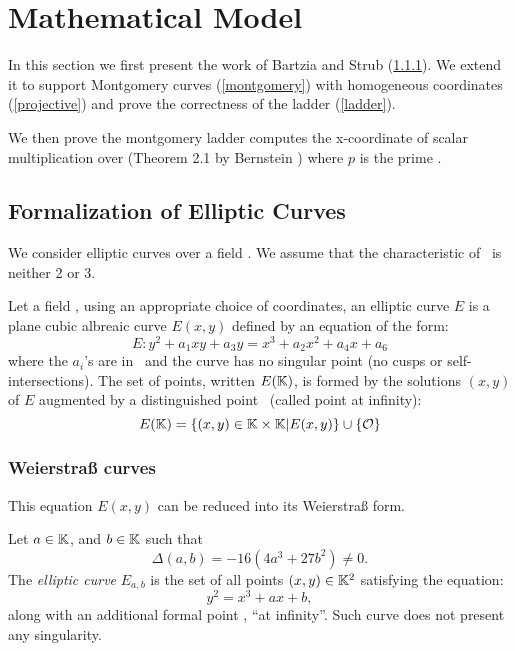 \section{Mathematical Model}

In this section we first present the work of Bartzia and Strub \cite{DBLP:conf/itp/BartziaS14} (\ref{Weierstrass}).
We extend it to support Montgomery curves (\ref{montgomery}) with homogeneous coordinates (\ref{projective}) and prove the correctness of the ladder (\ref{ladder}).

We then prove the montgomery ladder computes
the x-coordinate of scalar multiplication over 
(Theorem 2.1 by Bernstein \cite{Ber06}) where $p$ is the prime \p.

\subsection{Formalization of Elliptic Curves}

We consider elliptic curves over a field \K. We assume that the
characteristic of \K\ is neither 2 or 3.

\begin{definition}
Let a field \K, using an appropriate choice of coordinates, an elliptic curve $E$
is a plane cubic albreaic curve $E(x,y)$ defined by an equation of the form:
$$E : y^2 + a_1 xy + a_3 y = x^3 + a_2 x^2 + a_4 x + a_6$$
where the $a_i$'s are in \K\ and the curve has no singular point (\ie no cusps
or self-intersections). The set of points, written $E(\mathbb{K})$, is formed by the
solutions $(x,y)$ of $E$ augmented by a distinguished point \Oinf\ (called point at infinity):
$$E(\mathbb{K}) = \{(x,y) \in \mathbb{K} \times \mathbb{K} | E(x,y)\} \cup \{\mathcal{O}\}$$
\end{definition}

\subsubsection{Weierstra{\ss} curves}
\label{Weierstrass}
This equation $E(x,y)$ can be reduced into its Weierstra{\ss} form.

\begin{definition}
Let $a \in \mathbb{K}$, and $b \in \mathbb{K}$ such that $$\Delta(a,b) = -16(4a^3 + 27b^2) \neq 0.$$ The \textit{elliptic curve} $E_{a,b}$ is the set of all points $(x,y) \in \mathbb{K}^2$ satisfying the equation:
$$y^2 = x^3 + ax + b,$$
along with an additional formal point \Oinf, ``at infinity''. Such curve does not present any singularity.
\end{definition}

